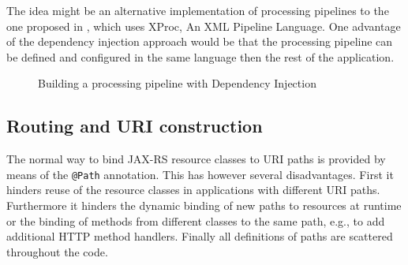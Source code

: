 \documentclass[11pt,a4paper,headsepline,twoside]{scrartcl}		%
\begin{document}
The idea might be an alternative implementation of processing pipelines to the
one proposed in \cite{Davis:2011:XTR:1967428.1967437}, which uses XProc, An XML
Pipeline Language. One advantage of the dependency injection approach would be
that the processing pipeline can be defined and configured in the same language
then the rest of the application.

\begin{figure}[tbp]
  \caption{Building a processing pipeline with Dependency Injection}
  \label{fig:dependency-injection-pipeline}
\end{figure}

\subsection{Routing and URI construction}
\label{sec:rout-uri-constr}

The normal way to bind JAX-RS resource classes to URI paths is provided by means
of the \lstinline:@Path: annotation. This has however several
disadvantages. First it hinders reuse of the resource classes in applications
with different URI paths. Furthermore it hinders the dynamic binding of new
paths to resources at runtime or the binding of methods from different classes
to the same path, e.g., to add additional HTTP method handlers. Finally all
definitions of paths are scattered throughout the code.
\end{document}
